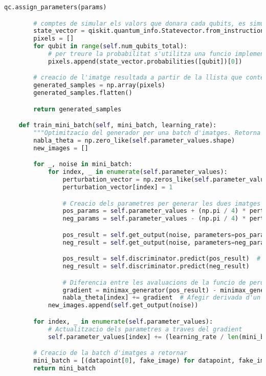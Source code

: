 \begin{lstlisting}[language=Python, caption=Codi final pel generador]
		qc.assign_parameters(params)

		# comptes de simular els valors que donara cada qubits, es simula l'estat final del circuit i d'aquest s'extreuen els valors que es mesuraran per a cada qubit
		state_vector = qiskit.quantum_info.Statevector.from_instruction(qc)
		pixels = []
		for qubit in range(self.num_qubits_total):
			# per treure la probabilitat s'utilitza una funcio implementada en Qiskit
			pixels.append(state_vector.probabilities([qubit])[0])

		# creacio de l'imatge resultada a partir de la llista que conte el valor per a cada pixel
		generated_samples = np.array(pixels)
		generated_samples.flatten()

		return generated_samples

	def train_mini_batch(self, mini_batch, learning_rate):
		"""Optimitzacio del generador per una batch d'imatges. Retorna una batch de les imatges generades amb unes imatges reals que poder donar com a input al generador. """
	 	nabla_theta = np.zero_like(self.parameter_values.shape)
		new_images = []

		for _, noise in mini_batch:
			for index, _ in enumerate(self.parameter_values):
				perturbation_vector = np.zeros_like(self.parameter_values)
				perturbation_vector[index] = 1

				# Creacio dels parametres per generar les dues imatges
				pos_params = self.parameter_values + (np.pi / 4) * perturbation_vector
				neg_params = self.parameter_values - (np.pi / 4) * perturbation_vector

				pos_result = self.get_output(noise, parameters=pos_params)  # Generacio imatges
				neg_result = self.get_output(noise, parameters=neg_params)

				pos_result = self.discriminator.predict(pos_result)  # Assignacio de les etiquetes
				neg_result = self.discriminator.predict(neg_result)

				# Diferencia entre les avaluacions de la funcio de perdua entre les dues etiquetes
				gradient = minimax_generator(pos_result) - minimax_generator(neg_result)
				nabla_theta[index] += gradient  # Afegir derivada d'un parametre al gradient
			new_images.append(self.get_output(noise))

		for index, _ in enumerate(self.parameter_values):
			# Actualitzacio dels parametres a traves del gradient
			self.parameter_values[index] += (learning_rate / len(mini_batch)) * nabla_theta[index]

		# Creacio de la batch d'imatges a retornar
		mini_batch = [(datapoint[0], fake_image) for datapoint, fake_image in zip(mini_batch, new_images)]
		return mini_batch
\end{lstlisting}


